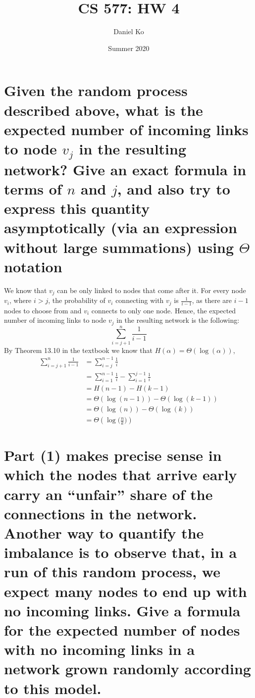 \documentclass[11pt]{scrartcl}
\title{CS 577: HW 4}
\author{Daniel Ko}
\date{Summer 2020}
\begin{document}
\maketitle

\section{
Given the random process described above, what is the expected number of
incoming links to node $v_j$ in the resulting network? Give an exact formula in terms of $n$ and $j$,
and also try to express this quantity asymptotically (via an expression without large summations)
using $\Theta$ notation
}

We know that $v_j$ can be only linked to nodes that come after it. 
For every node $v_i$, where $i > j$, the probability of $v_i$
connecting with $v_j$ is $\frac{1}{i-1}$, as there are $i-1$ nodes to choose from and $v_i$
connects to only one node. Hence, the expected number of
incoming links to node $v_j$ in the resulting network is the following:
$$
\sum_{i = j+1}^n \frac{1}{i-1}
$$
By Theorem 13.10 in the textbook we know that $H(\alpha) = \Theta(\log (\alpha))$,
\begin{align*}
	\sum_{i = j+1}^n \frac{1}{i-1} & = \sum_{i = j}^{n-1} \frac{1}{i} \\
	& = \sum_{i = 1}^{n-1} \frac{1}{i} - \sum_{i = 1}^{j-1} \frac{1}{i}\\
	& = H(n-1) - H(k-1)\\
	& = \Theta(\log(n-1)) - \Theta(\log(k-1))\\
	& =  \Theta(\log(n)) - \Theta(\log(k))\\
	& = \Theta(\log\Big(\frac{n}{k}\Big))
\end{align*}

\section{
Part (1) makes precise sense in which the nodes that arrive early carry an “unfair”
share of the connections in the network. Another way to quantify the imbalance is to observe
that, in a run of this random process, we expect many nodes to end up with no incoming links.
Give a formula for the expected number of nodes with no incoming links in a network grown
randomly according to this model.
}
\end{document}
